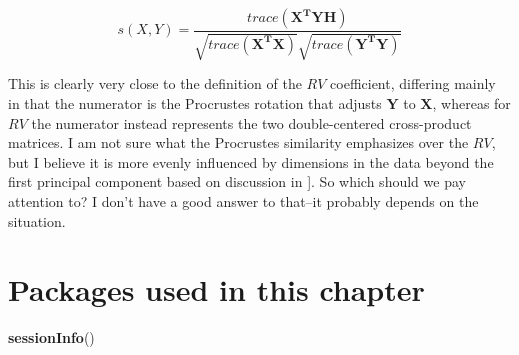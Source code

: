 \documentclass[
]{book}
\newenvironment{Shaded}{\begin{snugshade}}{\end{snugshade}}
\newcommand{\FunctionTok}[1]{\textcolor[rgb]{0.13,0.29,0.53}{\textbf{#1}}}
\newcommand{\NormalTok}[1]{#1}
\begin{document}
\[s(X,Y)=\frac{trace(\mathbf{X^TYH})}{\sqrt{trace(\mathbf{X^TX})}\sqrt{trace(\mathbf{Y^TY})}}\]

This is clearly very close to the definition of the \(RV\) coefficient, differing mainly in that the numerator is the Procrustes rotation that adjusts \(\mathbf{Y}\) to \(\mathbf{X}\), whereas for \(RV\) the numerator instead represents the two double-centered cross-product matrices. I am not sure what the Procrustes similarity emphasizes over the \(RV\), but I believe it is more evenly influenced by dimensions in the data beyond the first principal component based on discussion in \citet{tomicComparison2015}{]}. So which should we pay attention to? I don't have a good answer to that--it probably depends on the situation.

\section{Packages used in this chapter}\label{packages-used-in-this-chapter-12}

\begin{Shaded}
\begin{Highlighting}[]
\FunctionTok{sessionInfo}\NormalTok{()}
\end{Highlighting}
\end{Shaded}
\end{document}
